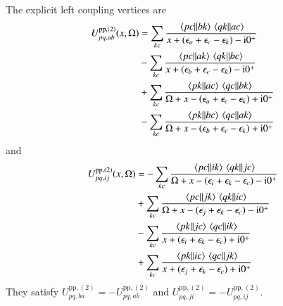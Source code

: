 \documentclass[aip,jcp,reprint,noshowkeys,superscriptaddress]{revtex4-1}
\newcommand{\eps}{\epsilon}
\newcommand{\ii}{\mathrm{i}}
\newcommand{\pp}{\text{pp}}
\begin{document}
The explicit left coupling vertices are
\begin{equation}
\begin{split}
U_{pq,ab}^{\pp,(2)}(x,\Omega)
&=
\sum_{kc}
\frac{\mel{pc}{}{bk}\mel{qk}{}{ac}}
{x+(\eps_a+\eps_c-\eps_k)-\ii0^+}
\\
&-
\sum_{kc}
\frac{\mel{pc}{}{ak}\mel{qk}{}{bc}}
{x+(\eps_b+\eps_c-\eps_k)-\ii0^+}
\\
&+
\sum_{kc}
\frac{\mel{pk}{}{ac}\mel{qc}{}{bk}}
{\Omega+x-(\eps_a+\eps_c-\eps_k)+\ii0^+}
\\
&-
\sum_{kc}
\frac{\mel{pk}{}{bc}\mel{qc}{}{ak}}
{\Omega+x-(\eps_b+\eps_c-\eps_k)+\ii0^+}
\end{split}
\label{eq:U_pp_second_ab}
\end{equation}
and
\begin{equation}
\begin{split}
U_{pq,ij}^{\pp,(2)}(x,\Omega)
&=
-
\sum_{kc}
\frac{\mel{pc}{}{ik}\mel{qk}{}{jc}}
{\Omega+x-(\eps_i+\eps_k-\eps_c)-\ii0^+}
\\
&+
\sum_{kc}
\frac{\mel{pc}{}{jk}\mel{qk}{}{ic}}
{\Omega+x-(\eps_j+\eps_k-\eps_c)-\ii0^+}
\\
&-
\sum_{kc}
\frac{\mel{pk}{}{jc}\mel{qc}{}{ik}}
{x+(\eps_i+\eps_k-\eps_c)+\ii0^+}
\\
&+
\sum_{kc}
\frac{\mel{pk}{}{ic}\mel{qc}{}{jk}}
{x+(\eps_j+\eps_k-\eps_c)+\ii0^+}
\end{split}
\label{eq:U_pp_second_ij}
\end{equation}
They satisfy
$U_{pq,ba}^{\pp,(2)}=-U_{pq,ab}^{\pp,(2)}$ and
$U_{pq,ji}^{\pp,(2)}=-U_{pq,ij}^{\pp,(2)}$.
\end{document}

